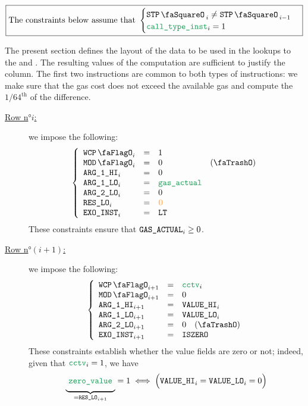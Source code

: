 \[
	\boxed{\text{The constraints below assume that }
	\begin{cases}
		\stpStamp_{i} \neq \stpStamp_{i - 1} \\
		\isCall  _{i} =    1                 \\
	\end{cases} }
\]

The present section defines the layout of the data to be used in the lookups to the \wcpMod{} and \modMod{}. The resulting values of the computation are sufficient to justify the \gasStipend{} column. The first two instructions are common to both types of instructions: we make sure that the gas cost does not exceed the available gas and compute the $1/64^{\text{th}}$ of the difference. 
\begin{description}
	\item[\underline{Row n$°i$:}] we impose the following:
		\[
			\left\{ \begin{array}{lclc}
				\wcpLookupFlag_{i} & = & 1 \\
				\divLookupFlag_{i} & = & 0 & (\trash) \\
				\argOneHi_{i}      & = & 0 \\
				\argOneLo_{i}      & = & \locGasActl \\
				\argTwoLo_{i}      & = & 0 \\
				\resLo_{i}         & = & \zeroRes \\
				\exoInst_{i}       & = & \inst{LT} \\
			\end{array} \right.
		\]
		These constraints ensure that $\texttt{GAS}\texttt{\_ACTUAL}_{i} \geq 0$.
	\item[\underline{Row n$°(i + 1)$:}] we impose the following:
		\[
			\left\{ \begin{array}{lclc}
				\wcpLookupFlag_{i + 1} & = & \cctv_{i} \\
				\divLookupFlag_{i + 1} & = & 0 \\
				\argOneHi_{i + 1}      & = & \valHi_{i} \\
				\argOneLo_{i + 1}      & = & \valLo_{i} \\
				\argTwoLo_{i + 1}      & = & 0  \quad (\trash) \\
				\exoInst_{i + 1}       & = & \inst{ISZERO} \\
			\end{array} \right.
		\]
		These constraints establish whether the value fields are zero or not; indeed, given that $\cctv_{i} = 1$, we have
		\[
			\underbrace{\phantom{\Big|}\locZeroValue\phantom{\Big|}}_{=\resLo_{i + 1}} = 1 \iff \Big(\valHi_{i} = \valLo_{i} = 0 \Big)
\]
\end{description}
